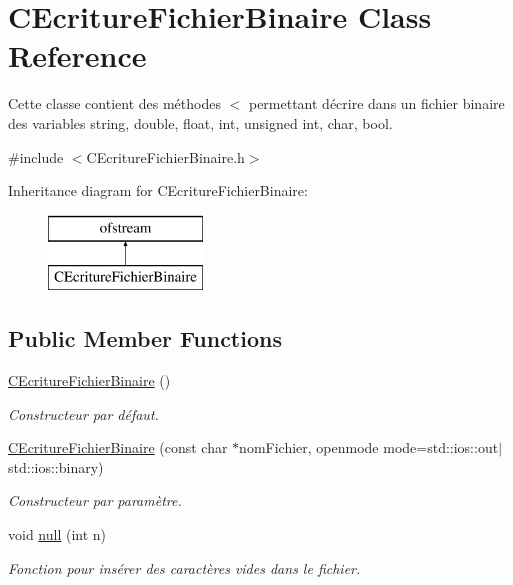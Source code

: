 \hypertarget{class_c_ecriture_fichier_binaire}{}\section{C\+Ecriture\+Fichier\+Binaire Class Reference}
\label{class_c_ecriture_fichier_binaire}


Cette classe contient des méthodes $<$ permettant d\textquotesingle{}écrire dans un fichier binaire des variables string, double, float, int, unsigned int, char, bool.  




{\ttfamily \#include $<$C\+Ecriture\+Fichier\+Binaire.\+h$>$}

Inheritance diagram for C\+Ecriture\+Fichier\+Binaire\+:\begin{figure}[H]
\begin{center}
\leavevmode
\includegraphics[height=2.000000cm]{class_c_ecriture_fichier_binaire}
\end{center}
\end{figure}
\subsection*{Public Member Functions}
\begin{DoxyCompactItemize}
\item 
\hyperlink{group__utilitaire_ga5b5846202001fecd71cd2a0afbbdb494}{C\+Ecriture\+Fichier\+Binaire} ()
\begin{DoxyCompactList}\small\item\em Constructeur par défaut. \end{DoxyCompactList}\item 
\hyperlink{group__utilitaire_gad19b9753aa12a9f25fd0febc3c899024}{C\+Ecriture\+Fichier\+Binaire} (const char $\ast$nom\+Fichier, openmode mode=std\+::ios\+::out$\vert$std\+::ios\+::binary)
\begin{DoxyCompactList}\small\item\em Constructeur par paramètre. \end{DoxyCompactList}\item 
void \hyperlink{group__utilitaire_ga7145545254c30909311d3b1ef0bdd07a}{null} (int n)
\begin{DoxyCompactList}\small\item\em Fonction pour insérer des caractères vides dans le fichier. \end{DoxyCompactList}\end{DoxyCompactItemize}
